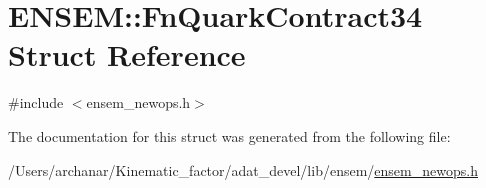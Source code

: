 \hypertarget{structENSEM_1_1FnQuarkContract34}{}\section{E\+N\+S\+EM\+:\+:Fn\+Quark\+Contract34 Struct Reference}
\label{structENSEM_1_1FnQuarkContract34}


{\ttfamily \#include $<$ensem\+\_\+newops.\+h$>$}



The documentation for this struct was generated from the following file\+:\begin{DoxyCompactItemize}
\item 
/\+Users/archanar/\+Kinematic\+\_\+factor/adat\+\_\+devel/lib/ensem/\mbox{\hyperlink{lib_2ensem_2ensem__newops_8h}{ensem\+\_\+newops.\+h}}\end{DoxyCompactItemize}
